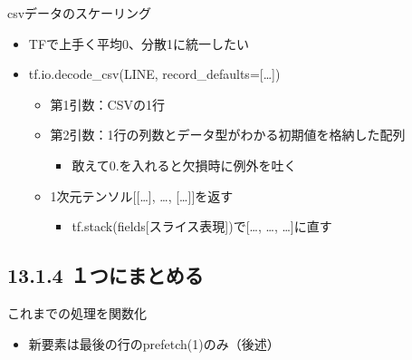 \documentclass[aspectratio=169, dvipdfmx, 14pt, xcolor={svgnames,dvipsnames}, t]{beamer}
\begin{document}
\begin{frame}{csvデータのスケーリング}

  \begin{itemize}
    \tightlist
    \item
          TFで上手く平均0、分散1に統一したい
    \item
          tf.io.decode\_csv(LINE, record\_defaults={[}\ldots{]})

          \begin{itemize}
            \tightlist
            \item
                  第1引数：CSVの1行
            \item
                  第2引数：1行の列数とデータ型がわかる初期値を格納した配列

                  \begin{itemize}
                    \tightlist
                    \item
                          敢えて0.を入れると欠損時に例外を吐く
                  \end{itemize}
            \item
                  1次元テンソル{[}{[}\ldots{]}, \ldots, {[}\ldots{]}{]}を返す

                  \begin{itemize}
                    \tightlist
                    \item
                          tf.stack(fields{[}スライス表現{]})で{[}\ldots, \ldots,
                          \ldots{]}に直す
                  \end{itemize}
          \end{itemize}
  \end{itemize}

\end{frame}


\hypertarget{ux3064ux306bux307eux3068ux3081ux308b}{%
  \subsection{13.1.4 １つにまとめる}\label{ux3064ux306bux307eux3068ux3081ux308b}}


\begin{frame}{これまでの処理を関数化}

  \begin{itemize}
    \tightlist
    \item
          新要素は最後の行のprefetch(1)のみ（後述）
  \end{itemize}

\end{frame}
\end{document}

